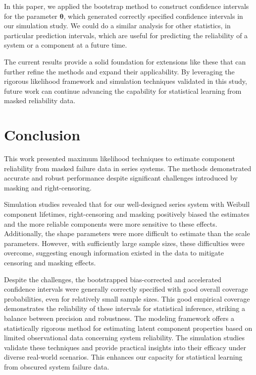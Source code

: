 \documentclass[
]{article}
\theoremstyle{definition}
\theoremstyle{plain}
\theoremstyle{definition}
\theoremstyle{definition}
\theoremstyle{definition}
\theoremstyle{definition}
\theoremstyle{remark}
\begin{document}
In this paper, we applied the bootstrap method to construct confidence
intervals for the parameter \(\boldsymbol{\theta}\), which generated correctly specified
confidence intervals in our simulation study. We could do a similar analysis for
other statistics, in particular prediction intervals, which are useful for
predicting the reliability of a system or a component at a future time.

The current results provide a solid foundation for extensions like these that
can further refine the methods and expand their applicability. By leveraging the
rigorous likelihood framework and simulation techniques validated in this study,
future work can continue advancing the capability for statistical learning from
masked reliability data.

\hypertarget{conclusion}{%
\section{Conclusion}\label{conclusion}}

This work presented maximum likelihood techniques to estimate component
reliability from masked failure data in series systems. The methods demonstrated
accurate and robust performance despite significant challenges introduced by
masking and right-censoring.

Simulation studies revealed that for our well-designed series system with
Weibull component lifetimes, right-censoring and masking positively biased the
estimates and the more reliable components were more sensitive to these effects.
Additionally, the shape parameters were more difficult to estimate than the
scale parameters. However, with sufficiently large sample sizes, these
difficulties were overcome, suggesting enough information existed in the data to
mitigate censoring and masking effects.

Despite the challenges, the bootstrapped bias-corrected and accelerated
confidence intervals were generally correctly specified with good overall
coverage probabilities, even for relatively small sample sizes. This good
empirical coverage demonstrates the reliability of these intervals for
statistical inference, striking a balance between precision and robustness. The
modeling framework offers a statistically rigorous method for estimating latent
component properties based on limited observational data concerning system
reliability. The simulation studies validate these techniques and provide
practical insights into their efficacy under diverse real-world scenarios. This
enhances our capacity for statistical learning from obscured system failure
data.
\end{document}
